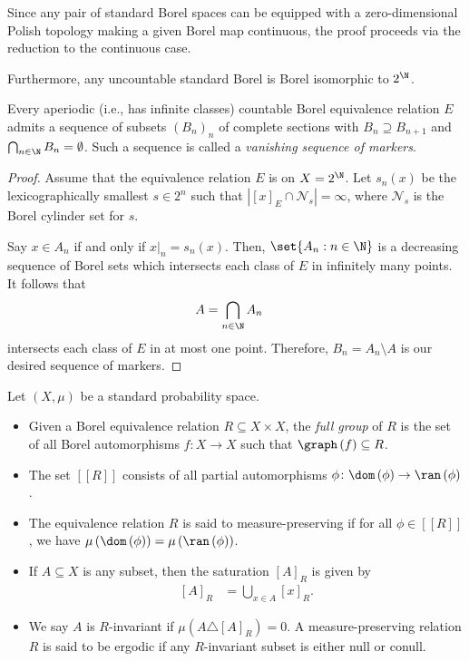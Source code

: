 \documentclass[10pt]{mypackage}
\begin{document}
\begin{remark}
  Since any pair of standard Borel spaces can be equipped with a zero-dimensional Polish topology making a given Borel map continuous, the proof proceeds via the reduction to the continuous case.

  Furthermore, any uncountable standard Borel is Borel isomorphic to $2^{\N}$.
\end{remark}
\begin{lemma}
  Every aperiodic (i.e., has infinite classes) countable Borel equivalence relation $E$ admits a sequence of subsets $\left( B_n \right)_n$ of complete sections with $B_n\supseteq B_{n+1}$ and $\bigcap_{n\in \N}B_n = \emptyset$. Such a sequence is called a \textit{vanishing sequence of markers}.
\end{lemma}
\begin{proof}
  Assume that the equivalence relation $E$ is on $X = 2^{\N}$. Let $s_n(x)$ be the lexicographically smallest $s\in 2^{n}$ such that $\left\vert \left[ x \right]_E\cap \mathcal{N}_s \right\vert = \infty$, where $\mathcal{N}_s$ is the Borel cylinder set for $s$.

  Say $x\in A_n$ if and only if $x|_{n} = s_n(x)$. Then, $\set{A_n : n\in \N}$ is a decreasing sequence of Borel sets which intersects each class of $E$ in infinitely many points. It follows that
  \begin{align*}
    A &= \bigcap_{n\in \N}A_n
  \end{align*}
  intersects each class of $E$ in at most one point. Therefore, $B_n = A_n\setminus A$ is our desired sequence of markers.
\end{proof}
\begin{definition}
  Let $ \left( X,\mu \right) $ be a standard probability space.
  \begin{itemize}
    \item Given a Borel equivalence relation $R\subseteq X\times X$, the \textit{full group} of $R$ is the set of all Borel automorphisms $f\colon X\to X$ such that $\graph\left( f \right)\subseteq R$.
    \item The set $\left[ \left[ R \right] \right]$ consists of all partial automorphisms $\phi\colon \dom\left( \phi \right)\rightarrow \ran\left( \phi \right)$.
    \item The equivalence relation $R$ is said to measure-preserving if for all $\phi\in \left[ \left[ R \right] \right]$, we have $\mu\left( \dom\left( \phi \right) \right) = \mu\left( \ran\left( \phi \right) \right)$. 
    \item If $A\subseteq X$ is any subset, then the saturation $\left[ A \right]_R$ is given by
      \begin{align*}
        \left[ A \right]_R &= \bigcup_{x\in A} \left[ x \right]_R.
      \end{align*}
    \item We say $A$ is $R$-invariant if $\mu\left( A\triangle \left[ A \right]_R \right) = 0$. A measure-preserving relation $R$ is said to be ergodic if any $R$-invariant subset is either null or conull.
  \end{itemize}
\end{definition}
\end{document}
